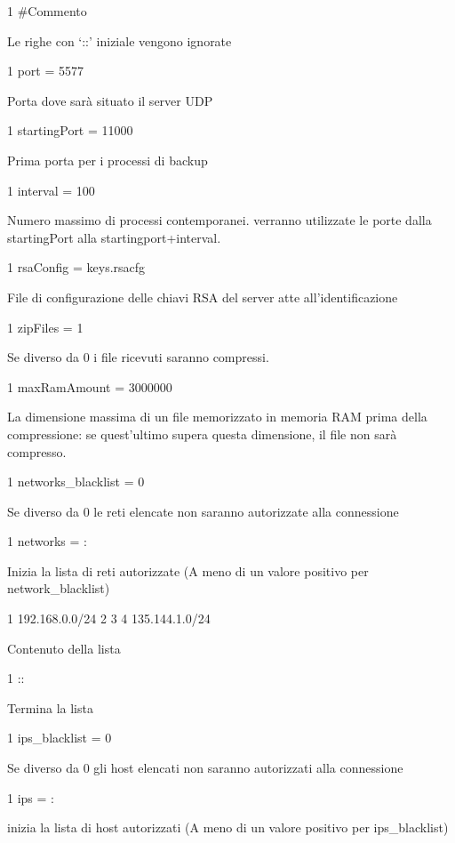 \begin{DoxyCode}
1 #Commento
\end{DoxyCode}
 Le righe con ‘\+::’ iniziale vengono ignorate 
\begin{DoxyCode}
1 port = 5577
\end{DoxyCode}
 Porta dove sarà situato il server U\+DP 
\begin{DoxyCode}
1 startingPort = 11000
\end{DoxyCode}
 Prima porta per i processi di backup 
\begin{DoxyCode}
1 interval = 100
\end{DoxyCode}
 Numero massimo di processi contemporanei. verranno utilizzate le porte dalla starting\+Port alla startingport+interval. 
\begin{DoxyCode}
1 rsaConfig = keys.rsacfg
\end{DoxyCode}
 File di configurazione delle chiavi R\+SA del server atte all’identificazione 
\begin{DoxyCode}
1 zipFiles = 1
\end{DoxyCode}
 Se diverso da 0 i file ricevuti saranno compressi. 
\begin{DoxyCode}
1 maxRamAmount = 3000000
\end{DoxyCode}
 La dimensione massima di un file memorizzato in memoria R\+AM prima della compressione\+: se quest’ultimo supera questa dimensione, il file non sarà compresso. 
\begin{DoxyCode}
1 networks\_blacklist = 0
\end{DoxyCode}
 Se diverso da 0 le reti elencate non saranno autorizzate alla connessione 
\begin{DoxyCode}
1 networks = :
\end{DoxyCode}
 Inizia la lista di reti autorizzate (A meno di un valore positivo per network\+\_\+blacklist) 
\begin{DoxyCode}
1 192.168.0.0/24
2 
3 
4 135.144.1.0/24
\end{DoxyCode}
 Contenuto della lista 
\begin{DoxyCode}
1 ::
\end{DoxyCode}
 Termina la lista 
\begin{DoxyCode}
1 ips\_blacklist = 0
\end{DoxyCode}
 Se diverso da 0 gli host elencati non saranno autorizzati alla connessione 
\begin{DoxyCode}
1 ips = :
\end{DoxyCode}
 inizia la lista di host autorizzati (A meno di un valore positivo per ips\+\_\+blacklist) 
